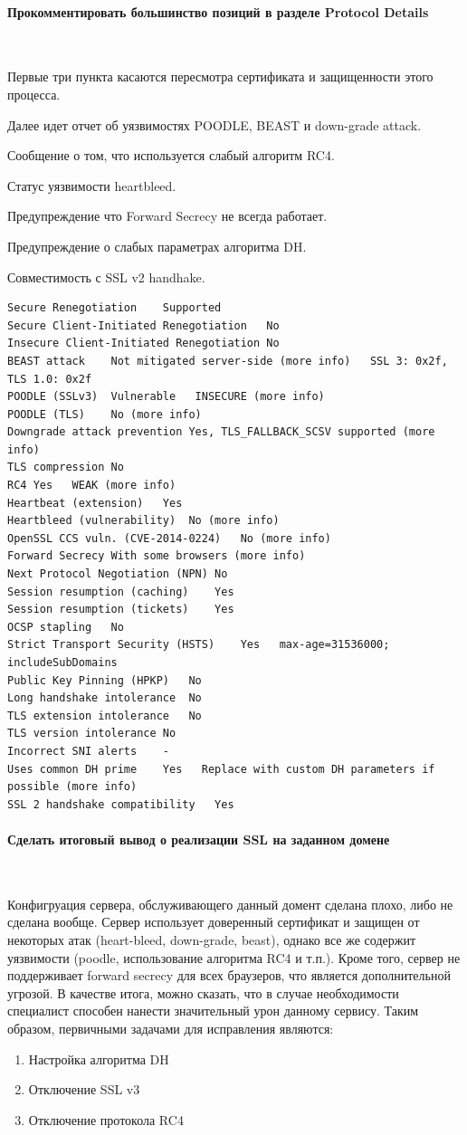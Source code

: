 \documentclass{article}
\begin{document}
\paragraph{Прокомментировать большинство позиций в разделе Protocol Details}
~

Первые три пункта касаются пересмотра сертификата и защищенности этого процесса.

Далее идет отчет об уязвимостях POODLE, BEAST и down-grade attack. 

Сообщение о том, что используется слабый алгоритм RC4.

Статус уязвимости heartbleed.

Предупреждение что Forward Secrecy не всегда работает.

Предупреждение о слабых параметрах алгоритма DH.

Совместимость с SSL v2 handhake.

\begin{verbatim}
Secure Renegotiation	Supported
Secure Client-Initiated Renegotiation	No
Insecure Client-Initiated Renegotiation	No
BEAST attack	Not mitigated server-side (more info)   SSL 3: 0x2f, TLS 1.0: 0x2f
POODLE (SSLv3)	Vulnerable   INSECURE (more info)
POODLE (TLS)	No (more info)
Downgrade attack prevention	Yes, TLS_FALLBACK_SCSV supported (more info)
TLS compression	No
RC4	Yes   WEAK (more info)
Heartbeat (extension)	Yes
Heartbleed (vulnerability)	No (more info)
OpenSSL CCS vuln. (CVE-2014-0224)	No (more info)
Forward Secrecy	With some browsers (more info)
Next Protocol Negotiation (NPN)	No
Session resumption (caching)	Yes
Session resumption (tickets)	Yes
OCSP stapling	No
Strict Transport Security (HSTS)	Yes   max-age=31536000; includeSubDomains
Public Key Pinning (HPKP)	No
Long handshake intolerance	No
TLS extension intolerance	No
TLS version intolerance	No
Incorrect SNI alerts	-
Uses common DH prime	Yes   Replace with custom DH parameters if possible (more info)
SSL 2 handshake compatibility	Yes
\end{verbatim}

\paragraph{Сделать итоговый вывод о реализации SSL на заданном домене}
~

Конфигруация сервера, обслуживающего данный домент сделана плохо, либо не сделана вообще. Сервер использует доверенный сертификат и защищен от некоторых атак (heart-bleed, down-grade, beast), однако все же содержит уязвимости (poodle, использование алгоритма RC4 и т.п.). Кроме того, сервер не поддерживает forward secrecy для всех браузеров, что является дополнительной угрозой. В качестве итога, можно сказать, что в случае необходимости специалист способен нанести значительный урон данному сервису. Таким образом, первичными задачами для исправления являются:
\begin{enumerate}
\item Настройка алгоритма DH
\item Отключение SSL v3
\item Отключение протокола RC4
\end{enumerate}
\end{document}
